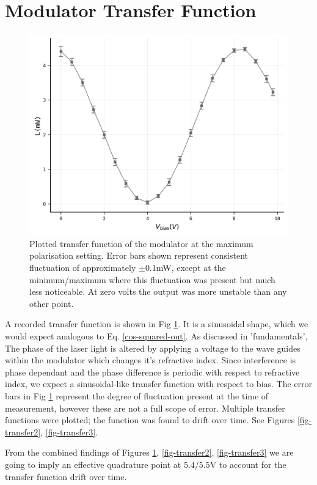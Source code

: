 \documentclass[12pt,a4paper]{report}
\begin{document}
\section{Modulator Transfer Function}\label{sec:TF}
\begin{figure}
\centering
\includegraphics[width=0.85\columnwidth]{Transfer Function 1(mW)error_figure.png} 
\caption{Plotted transfer function of the modulator at the maximum polarisation setting. Error bars shown represent consistent fluctuation of approximately $\pm{}$0.1mW, except at the minimum/maximum where this fluctuation was present but much less noticeable. At zero volts the output was more unstable than any other point.}
\label{fig-transfer1}
\end{figure}
A recorded transfer function is shown in Fig \ref{fig-transfer1}. It is a sinusoidal shape, which we would expect analogous to Eq. \ref{cos-squared-out}. As discussed in 'fundamentals', The phase of the laser light is altered by applying a voltage to the wave guides within the modulator which changes it's refractive index. Since interference is phase dependant and the phase difference is periodic with respect to refractive index, we expect a sinusoidal-like transfer function with respect to bias. The error bars in Fig \ref{fig-transfer1} represent the degree of fluctuation present at the time of measurement, however these are not a full scope of error. Multiple transfer functions were plotted; the function was found to drift over time. See Figures \ref{fig-transfer2}, \ref{fig-transfer3}.

From the combined findings of Figures \ref{fig-transfer1}, \ref{fig-transfer2}, \ref{fig-transfer3} we are going to imply an effective quadrature point at $5.4/5.5$V to account for the transfer function drift over time.
\end{document}
